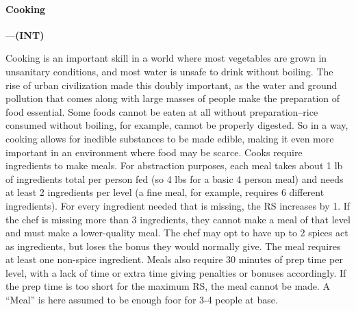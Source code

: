 \documentclass[oneside,11pt,english]{book}
\begin{document}
\paragraph{\label{skill:Cooking}Cooking}---\quad\textbf{(INT) }\par
Cooking is an important skill in a world where most vegetables are grown in
unsanitary conditions, and most water is unsafe to drink without boiling. The
rise of urban civilization made this doubly important, as the water and ground
pollution that comes along with large masses of people make the preparation of
food essential. Some foods cannot be eaten at all without preparation--rice
consumed without boiling, for example, cannot be properly digested. So in a way,
cooking allows for inedible substances to be made edible, making it even more
important in an environment where food may be scarce. Cooks require ingredients
to make meals. For abstraction purposes, each meal takes about 1 lb of
ingredients total per person fed (so 4 lbs for a basic 4 person meal) and needs
at least 2 ingredients per level (a fine meal, for example, requires 6 different
ingredients). For every ingredient needed that is missing, the RS increases by
1. If the chef is missing more than 3 ingredients, they cannot make a meal of
that level and must make a lower-quality meal. The chef may opt to have up to 2
spices act as ingredients, but loses the bonus they would normally give. The
meal requires at least one non-spice ingredient. Meals also require 30 minutes
of prep time per level, with a lack of time or extra time giving penalties or
bonuses accordingly. If the prep time is too short for the maximum RS, the meal
cannot be made. A “Meal” is here assumed to be enough foor for 3-4 people at
base. 
\end{document}
